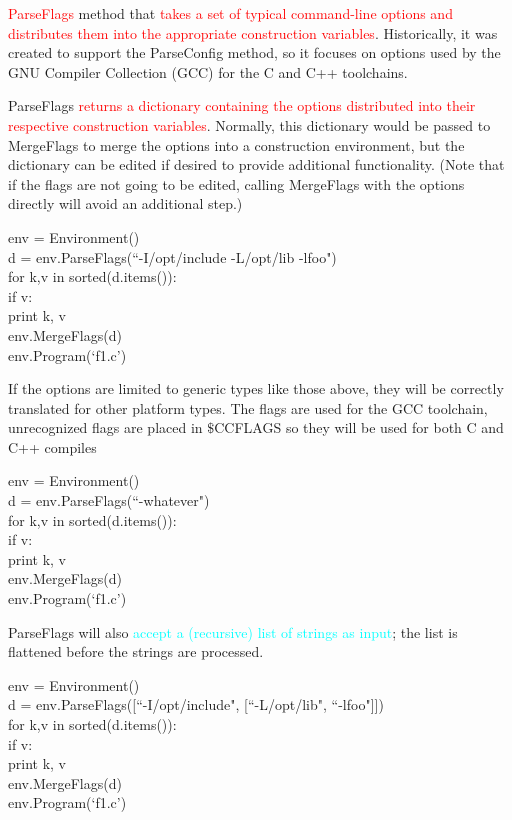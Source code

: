 \documentclass[12pt,a4paper]{article}
\begin{document}
\textcolor{red}{ParseFlags} method that \textcolor{red}{takes a set of typical command-line options and distributes them into the appropriate construction variables}. Historically, it was created to support the ParseConfig method, so it focuses on options used by the GNU Compiler Collection (GCC) for the C and C++ toolchains.

ParseFlags \textcolor{red}{returns a dictionary containing the options distributed into their respective construction variables}. Normally, this dictionary would be passed to MergeFlags to merge the options into a construction environment, but the dictionary can be edited if desired to provide additional functionality. (Note that if the flags are not going to be edited, calling MergeFlags with the options directly will avoid an additional step.)

env = Environment() \\
d = env.ParseFlags(``-I/opt/include -L/opt/lib -lfoo") \\
for k,v in sorted(d.items()): \\
    if v: \\
       print k, v \\
env.MergeFlags(d) \\
env.Program(`f1.c')

If the options are limited to generic types like those above, they will be correctly translated for other platform types. The flags are used for the GCC toolchain, unrecognized flags are placed in $\$$CCFLAGS so they will be used for both C and C++ compiles

env = Environment() \\
d = env.ParseFlags(``-whatever") \\
for k,v in sorted(d.items()): \\
    if v: \\
        print k, v \\
env.MergeFlags(d) \\
env.Program(`f1.c')

ParseFlags will also \textcolor{cyan}{accept a (recursive) list of strings as input}; the list is flattened before the strings are processed.

env = Environment() \\
d = env.ParseFlags([``-I/opt/include", [``-L/opt/lib", ``-lfoo"]]) \\
for k,v in sorted(d.items()): \\
    if v: \\
        print k, v \\
env.MergeFlags(d) \\
env.Program(`f1.c')
\end{document}
